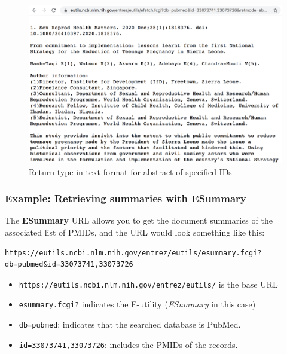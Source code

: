 \documentclass[
]{book}
\begin{document}
\begin{figure}

{\centering \includegraphics[width=0.8\linewidth]{images/api/pubmed-efetch} 

}

\caption{Return type in text format for abstract of specified IDs}\label{fig:unnamed-chunk-148}
\end{figure}

\hypertarget{example-retrieving-summaries-with-esummary}{%
\subsubsection*{Example: Retrieving summaries with ESummary}\label{example-retrieving-summaries-with-esummary}}

The \textbf{ESummary} URL allows you to get the document summaries of the associated
list of PMIDs, and the URL would look something like this:

\begin{verbatim}
https://eutils.ncbi.nlm.nih.gov/entrez/eutils/esummary.fcgi?db=pubmed&id=33073741,33073726
\end{verbatim}

\begin{itemize}
\item
  \texttt{https://eutils.ncbi.nlm.nih.gov/entrez/eutils/} is the base URL
\item
  \texttt{esummary.fcgi?} indicates the E-utility (\emph{ESummary} in this case)
\item
  \texttt{db=pubmed}: indicates that the searched database is PubMed.
\item
  \texttt{id=33073741,33073726}: includes the PMIDs of the records.
\end{itemize}
\end{document}
